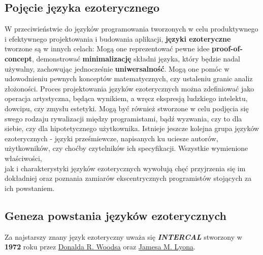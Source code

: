 \documentclass[fleqn,10pt]{SelfArx} %
\begin{document}
\subsection{Pojęcie języka ezoterycznego}
	W przeciwieństwie do języków programowania tworzonych w celu produktywnego i efektywnego
	projektowania i budowania aplikacji, \textbf{języki ezoteryczne} tworzone są w innych celach: Mogą one reprezentować pewne idee \textbf{proof-of-concept},
	demonstrować \textbf{minimalizację} składni języka, który będzie nadal używalny, zachowując jednocześnie \textbf{uniwersalność}.
	Mogą one pomóc w udowodnieniu pewnych konceptów matematycznych, czy ustaleniu granic analiz złożoności.
	Proces projektowania języków ezoterycznych można zdefiniować jako operacja artystyczna,
	będąca wynikiem, a wręcz ekspresją ludzkiego intelektu, dowcipu, czy zmysłu estetyki.
	Mogą być również stworzone w celu podjęcia się swego rodzaju rywalizacji między programistami, bądź wyzwania, czy to dla siebie, czy dla hipotetycznego użytkownika.
	Istnieje jeszcze kolejna grupa języków ezoterycznych - języki prześmiewcze, napisanych ku uciesze autorów, użytkowników, czy choćby czytelników ich specyfikacji\cite{morr2015esoteric}.
	Wszystkie wymienione właściwości,\\jak i charakterystyki języków ezoterycznych wywołują chęć przyjrzenia się im dokładniej oraz poznania zamiarów ekscentrycznych programistów stojących za ich powstaniem.


\subsection{Geneza powstania języków ezoterycznych}
Za najstarszy znany język ezoteryczny uważa się \hypertarget{oldestLang}{\textbf{\textit{INTERCAL}}} stworzony w \textbf{1972} roku 
przez \underline{Donalda R. Woodsa} oraz \underline{Jamesa M. Lyona}.
\end{document}
